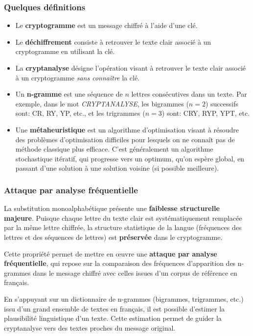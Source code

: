 \documentclass[a4paper]{article}
\begin{document}
\subsubsection{Quelques définitions}

\begin{itemize}
    \item Le \textbf{cryptogramme} est un message chiffré à l'aide d'une clé.
    \item Le \textbf{déchiffrement} consiste à retrouver le texte clair associé à un cryptogramme en utilisant la clé.
    \item La \textbf{cryptanalyse} désigne l’opération visant à retrouver le texte clair associé à un cryptogramme \textit{sans connaître} la clé.
    \item Un \textbf{n-gramme} est une séquence de $n$ lettres consécutives dans un texte. Par exemple, dans le mot \textit{CRYPTANALYSE}, les bigrammes ($n = 2$) successifs sont: CR, RY, YP, etc., et les trigrammes ($n = 3$) sont: CRY, RYP, YPT, etc.
    \item Une \textbf{métaheuristique} est un algorithme d’optimisation visant à résoudre des problèmes d’optimisation difficiles pour lesquels on ne connaît pas de méthode classique plus efficace. C'est généralement un algorithme stochastique itératif, qui
    progresse vers un optimum, qu'on espère global, en passant d'une solution à une solution voisine (si possible meilleure).
\end{itemize}

\subsubsection{Attaque par analyse fréquentielle}

La substitution monoalphabétique présente une \textbf{faiblesse structurelle majeure}. Puisque chaque lettre du texte clair est systématiquement remplacée par la même lettre chiffrée, la structure statistique de la langue (fréquences des lettres et des séquences de lettres) est \textbf{préservée} dans le cryptogramme.

Cette propriété permet de mettre en œuvre une \textbf{attaque par analyse fréquentielle}, qui repose sur la comparaison des fréquences d’apparition des n-grammes dans le message chiffré avec celles issues d’un corpus de référence en français.

En s’appuyant sur un dictionnaire de n-grammes (bigrammes, trigrammes, etc.) issu d’un grand ensemble de textes en français, il est possible d’estimer la plausibilité linguistique d’un texte. Cette estimation permet de guider la cryptanalyse vers des textes proches du message original.
\end{document}
